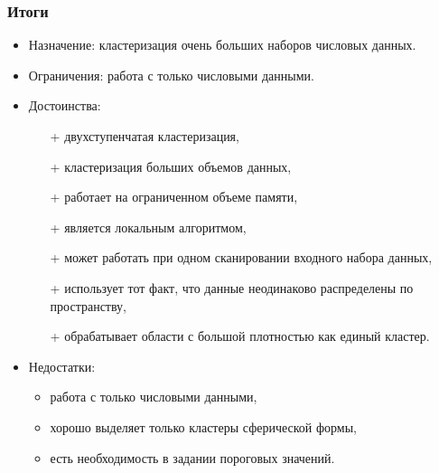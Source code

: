 \subsubsection{Итоги}
\begin{itemize}
\item Назначение: кластеризация очень больших наборов числовых данных. 
\item Ограничения: работа с только числовыми данными. 
\item Достоинства:
\begin{itemize} 
\item[+] двухступенчатая кластеризация, 
\item[+] кластеризация больших объемов данных, 
\item[+] работает на ограниченном объеме памяти, 
\item[+] является локальным алгоритмом, 
\item[+] может работать при одном сканировании входного набора данных,
\item[+] использует тот факт, что данные неодинаково распределены по пространству,  
\item[+] обрабатывает области с большой плотностью как единый кластер.
\end{itemize} 
\item Недостатки: 
\begin{itemize}
\item работа с только числовыми данными, 
\item хорошо выделяет только кластеры сферической формы, 
\item есть необходимость в задании пороговых значений.
\end{itemize} 
\end{itemize} 
